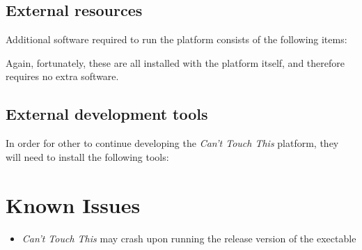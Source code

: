 \documentclass[a4paper]{article}
\providecommand{\tightlist}{%
\setlength{\itemsep}{0pt}\setlength{\parskip}{0pt}}
\begin{document}
  \subsection{External resources}
  Additional software required to run the platform consists of the following
  items:

  Again, fortunately, these are all installed with the platform itself, and
  therefore requires no extra software.

  \subsection{External development tools}
  In order for other to continue developing the \textit{Can't Touch This}
  platform, they will need to install the following tools:
  \clearpage






  \section{Known Issues}
  \begin{itemize}
    \tightlist
    \item \textit{Can't Touch This} may crash upon running the release version of the
      exectable
  \end{itemize}
\end{document}
